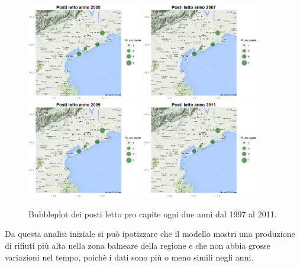 \documentclass[a4paper,11pt,twoside,openright]{book}							%
\begin{document}
\begin{figure}[H]
	\includegraphics[trim=0cm 0cm 0cm 0cm,clip=true,width=0.45\textwidth]{Immagini/venezia_dati/PL2005.png}
	\includegraphics[trim=0cm 0cm 0cm 0cm,clip=true,width=0.45\textwidth]{Immagini/venezia_dati/PL2007.png}
	\includegraphics[trim=0cm 0cm 0cm 0cm,clip=true,width=0.45\textwidth]{Immagini/venezia_dati/PL2009.png}
	\includegraphics[trim=0cm 0cm 0cm 0cm,clip=true,width=0.45\textwidth]{Immagini/venezia_dati/PL2011.png}
	\caption{Bubbleplot dei posti letto pro capite ogni due anni dal 1997 al 2011.}
	\label{fig:Ven_bubblePL}
\end{figure}
\newpage
Da questa analisi iniziale si può ipotizzare che il modello mostri una produzione di rifiuti più alta nella zona balneare della regione e che non abbia grosse variazioni nel tempo, poichè i dati sono più o meno simili negli anni. 
\end{document}
